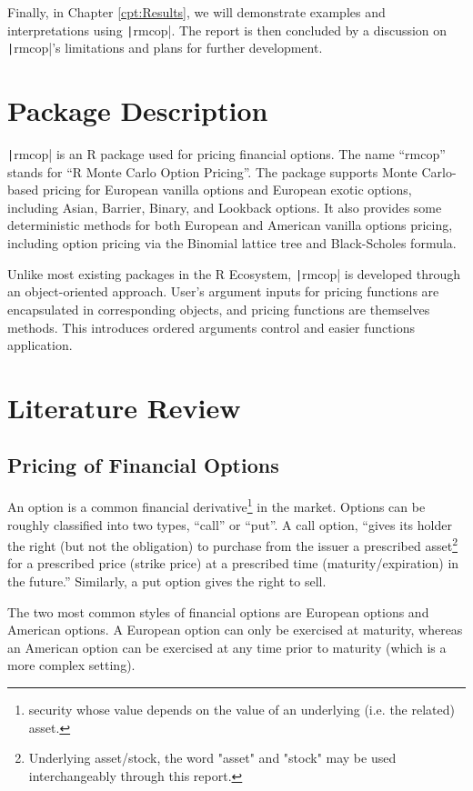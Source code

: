 Finally, in Chapter \ref{cpt:Results}, we will demonstrate examples and interpretations using \texttt|rmcop|. The report is then concluded by a discussion on \texttt|rmcop|'s limitations and plans for further development.

\section{Package Description} \label{sec:Pkg Description}

\texttt|rmcop| is an R package used for pricing financial options. The name ``rmcop'' stands for ``R Monte Carlo Option Pricing''. The package supports Monte Carlo-based pricing for European vanilla options and European exotic options, including Asian, Barrier, Binary, and Lookback options. It also provides some deterministic methods for both European and American vanilla options pricing, including option pricing via the Binomial lattice tree and Black-Scholes formula.

Unlike most existing packages in the R Ecosystem, \texttt|rmcop| is developed through an object-oriented approach. User's argument inputs for pricing functions are encapsulated in corresponding objects, and pricing functions are themselves methods. This introduces ordered arguments control and easier functions application.

\section{Literature Review} \label{sec:Literature Review}

\subsection{Pricing of Financial Options}

An option is a common financial derivative\footnote{security whose value depends on the value of an underlying (i.e. the related) asset.} in the market. Options can be roughly classified into two types, ``call'' or ``put''. A call option, ``gives its holder the right (but not the obligation) to purchase from the issuer a prescribed asset\footnote{Underlying asset/stock, the word "asset" and "stock" may be used interchangeably through this report.} for a prescribed price (strike price) at a prescribed time (maturity/expiration) in the future.\cite{Higham2004}'' Similarly, a put option gives the right to sell.

The two most common styles of financial options are European options and American options. A European option can only be exercised at maturity, whereas an American option can be exercised at any time prior to maturity (which is a more complex setting).

